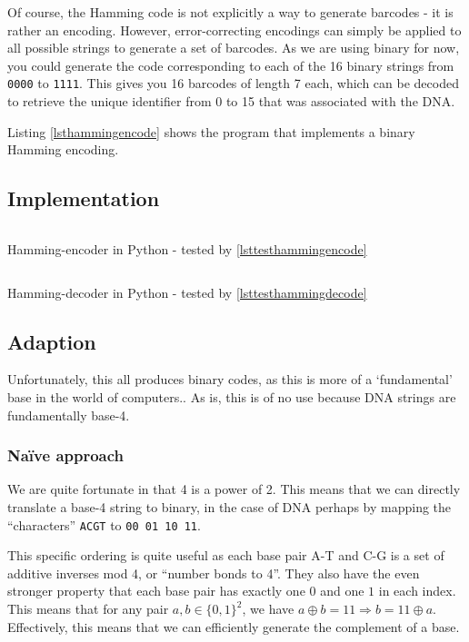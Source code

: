 \documentclass[a4paper,11pt]{article}
\newenvironment{longlisting}
{\addvspace{\baselineskip}\captionsetup{type=listing}}
{\addvspace{\baselineskip}}
\begin{document}
    Of course, the Hamming code is not explicitly a way to generate barcodes -
    it is rather an encoding. However, error-correcting encodings can simply be
    applied to all possible strings to generate a set of barcodes. As we are
    using binary for now, you could generate the code corresponding to each of
    the 16 binary strings from \texttt{0000} to \texttt{1111}. This gives you 16
    barcodes of length 7 each, which can be decoded to retrieve the unique
    identifier from 0 to 15 that was associated with the DNA.

    Listing \ref{lsthammingencode} shows the program that implements a binary
    Hamming encoding.

    \subsection{Implementation}

\begin{longlisting}
\inputminted{python}{../src/encode_hamming.py}
\caption{Hamming-encoder in Python - tested by \ref{lsttesthammingencode}}
\label{lsthammingencode}
\end{longlisting}

\begin{longlisting}
\inputminted{python}{../src/decode_hamming.py}
\caption{Hamming-decoder in Python - tested by \ref{lsttesthammingdecode}}
\label{lsthammingdecode}
\end{longlisting}

    \subsection{Adaption}

    Unfortunately, this all produces binary codes, as this is more of a
    `fundamental' base in the world of computers.. As is, this is of no use
    because DNA strings are fundamentally base-4.

    \subsubsection{Na\"ive approach}

    We are quite fortunate in that 4 is a power of 2. This means that
    we can directly translate a base-4 string to binary, in the case of DNA
    perhaps by mapping the ``characters'' \texttt{ACGT} to \texttt{00 01 10 11}.

    This specific ordering is quite useful as each base pair A-T and C-G is a
    set of additive inverses mod 4, or ``number bonds to 4''. They also have the
    even stronger property that each base pair has exactly one $0$ and one $1$
    in each index. This means that for any pair $a, b \in \{0,1\}^2$, we have
    $a \oplus b = 11 \Rightarrow b = 11 \oplus a$. Effectively, this means that
    we can efficiently generate the complement of a base.
\end{document}
